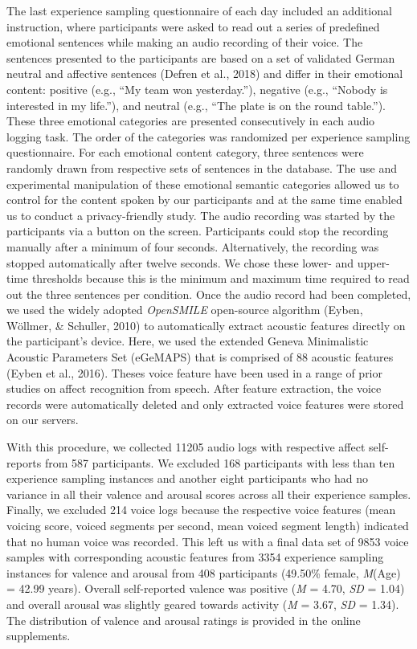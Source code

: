 \documentclass[
  english,
  man,floatsintext]{apa6}
\begin{document}
The last experience sampling questionnaire of each day included an additional instruction, where participants were asked to read out a series of predefined emotional sentences while making an audio recording of their voice. The sentences presented to the participants are based on a set of validated German neutral and affective sentences (Defren et al., 2018) and differ in their emotional content: positive (e.g., ``My team won yesterday.''), negative (e.g., ``Nobody is interested in my life.''), and neutral (e.g., ``The plate is on the round table.''). These three emotional categories are presented consecutively in each audio logging task. The order of the categories was randomized per experience sampling questionnaire. For each emotional content category, three sentences were randomly drawn from respective sets of sentences in the database. The use and experimental manipulation of these emotional semantic categories allowed us to control for the content spoken by our participants and at the same time enabled us to conduct a privacy-friendly study. The audio recording was started by the participants via a button on the screen. Participants could stop the recording manually after a minimum of four seconds. Alternatively, the recording was stopped automatically after twelve seconds. We chose these lower- and upper-time thresholds because this is the minimum and maximum time required to read out the three sentences per condition.
Once the audio record had been completed, we used the widely adopted \emph{OpenSMILE} open-source algorithm (Eyben, Wöllmer, \& Schuller, 2010) to automatically extract acoustic features directly on the participant's device. Here, we used the extended Geneva Minimalistic Acoustic Parameters Set (eGeMAPS) that is comprised of 88 acoustic features (Eyben et al., 2016). Theses voice feature have been used in a range of prior studies on affect recognition from speech. After feature extraction, the voice records were automatically deleted and only extracted voice features were stored on our servers.

With this procedure, we collected 11205 audio logs with respective affect self-reports from 587 participants. We excluded 168 participants with less than ten experience sampling instances and another eight participants who had no variance in all their valence and arousal scores across all their experience samples. Finally, we excluded 214 voice logs because the respective voice features (mean voicing score, voiced segments per second, mean voiced segment length) indicated that no human voice was recorded.
This left us with a final data set of 9853 voice samples with corresponding acoustic features from 3354 experience sampling instances for valence and arousal from 408 participants (49.50\% female, \emph{M}(Age) = 42.99 years). Overall self-reported valence was positive (\emph{M} = 4.70, \emph{SD} = 1.04) and overall arousal was slightly geared towards activity (\emph{M} = 3.67, \emph{SD} = 1.34). The distribution of valence and arousal ratings is provided in the online supplements.
\end{document}
